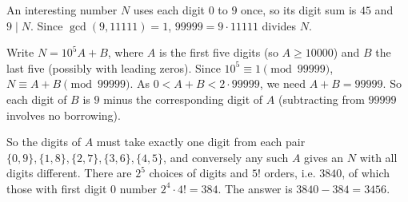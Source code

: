 An interesting number $N$ uses each digit $0$ to $9$ once, so its digit sum is $45$ and $9\mid N$. Since $\gcd(9,11111)=1$, $99999=9\cdot11111$ divides $N$.

Write $N=10^5A+B$, where $A$ is the first five digits (so $A\ge10000$) and $B$ the last five (possibly with leading zeros). Since $10^5\equiv1\pmod{99999}$, $N\equiv A+B\pmod{99999}$. As $0<A+B<2\cdot99999$, we need $A+B=99999$. So each digit of $B$ is $9$ minus the corresponding digit of $A$ (subtracting from $99999$ involves no borrowing).

So the digits of $A$ must take exactly one digit from each pair $\{0,9\},\{1,8\},\{2,7\},\{3,6\},\{4,5\}$, and conversely any such $A$ gives an $N$ with all digits different. There are $2^5$ choices of digits and $5!$ orders, i.e. $3840$, of which those with first digit $0$ number $2^4\cdot4!=384$. The answer is $3840-384=\boxed{3456}$.
